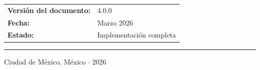 \begin{titlepage}
  \vspace{1.5cm}

  \begin{tabular}{ll}
    \textbf{Versión del documento:} & 4.0.0 \\
    \textbf{Fecha:}                 & Marzo 2026 \\
    \textbf{Estado:}                & Implementación completa \\
  \end{tabular}

  \vfill

  \noindent\rule{\textwidth}{1.2pt}
  {\small Ciudad de México, México $\cdot$ 2026}
\end{titlepage}
